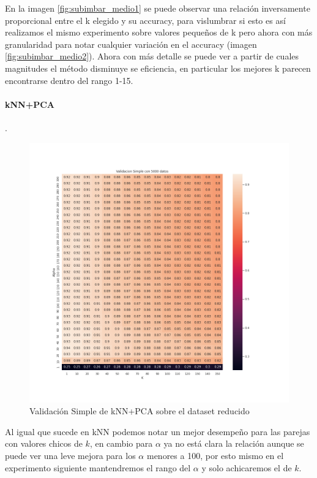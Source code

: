 \par

En la imagen \ref{fig:subimbar_medio1} se puede observar una relación inversamente proporcional entre el k elegido y su accuracy, para vislumbrar si esto es así realizamos el mismo experimento sobre valores pequeños de k pero ahora con más granularidad para notar cualquier variación en el accuracy (imagen \ref{fig:subimbar_medio2}). Ahora con más detalle se puede ver a partir de cuales magnitudes el método disminuye se eficiencia, en particular los mejores k parecen encontrarse dentro del rango 1-15.

\paragraph{kNN+PCA}
.
\par 
\begin{figure}[H]
    \centering
    \includegraphics[width=12cm]{images/validacionSimple_heatmap_datasetRedux}%
    \qquad
    \caption{Validación Simple de kNN+PCA sobre el dataset reducido}
    \label{knnpca_preliminar}%
\end{figure}

Al igual que sucede en kNN podemos notar un mejor desempeño para las parejas con valores chicos de $k$, en cambio para $\alpha$ ya no está clara la relación aunque se puede ver una leve mejora para los $\alpha$ menores a 100, por esto mismo en el experimento siguiente mantendremos el rango del $\alpha$ y solo achicaremos el de $k$.

